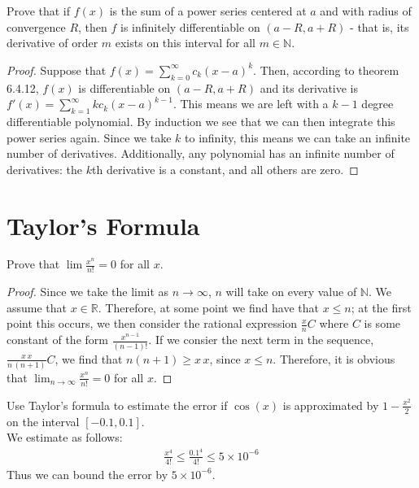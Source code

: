 \documentclass[12pt]{book}
\newcommand{\N}{\mathbb{N}}
\newcommand{\R}{\mathbb{R}}
\newenvironment{exercise}[2][Exercise]{\begin{trivlist}
\item[\hskip \labelsep {\bfseries #1}\hskip \labelsep {\bfseries #2.}]}{\end{trivlist}}
\begin{document}
\begin{exercise}{6.4.12}
Prove that if $f(x)$ is the sum of a power series centered at $a$ and with radius of convergence $R$, then $f$ is infinitely differentiable on $(a-R,a+R)$ - that is, its derivative of order $m$ exists on this interval for all $m \in \N$.

   \begin{proof}
   Suppose that $f(x) = \sum_{k=0}^\infty c_k \left( x-a\right)^k$. Then, according to theorem 6.4.12, $f(x)$ is differentiable on $\left(a-R, a+R\right)$ and its derivative is $f'(x) = \sum_{k=1}^\infty k c_k \left( x-a\right)^{k-1} $. This means we are left with a $k-1$ degree differentiable polynomial. By induction we see that we can then integrate this power series again. Since we take $k$ to infinity, this means we can take an infinite number of derivatives. Additionally, any polynomial has an infinite number of derivatives: the $k$th derivative is a constant, and all others are zero.
   \end{proof}
\end{exercise}

\section{Taylor's Formula}

\begin{exercise}{6.5.1}
Prove that $\lim \frac{x^n}{n!} = 0$ for all $x$.

\begin{proof}
    Since we take the limit as $n \to \infty$, $n$ will take on every value of $\N$. We assume that $x \in \R$. Therefore, at some point we find have that $x \leq n$; at the first point this occurs, we then consider the rational expression $\frac{x}{n} C$ where $C$ is some constant of the form $\frac{x^{n-1}}{\left(n-1\right)!}$. If we consier the next term in the sequence, $\frac{x\, x}{n\, (n+1)}C$, we find that $n \left(n+1\right)\geq x\,x$, since $x\leq n$. Therefore, it is obvious that $\lim_{n \to \infty} \frac{x^n}{n!}=0$ for all $x$.
\end{proof}
\end{exercise}



\begin{exercise}{6.5.3}
Use Taylor's formula to estimate the error if $\cos(x)$ is approximated by $1-\frac{x^2}{2}$ on the interval $[-0.1,0.1]$. \\

We estimate as follows:
    \begin{align*}
       \frac{x^4}{4!} \leq \frac{0.1^4}{4!} \leq 5\times10^{-6}
    \end{align*}
    Thus we can bound the error by $5\times10^{-6}$.
\end{exercise}
\end{document}
